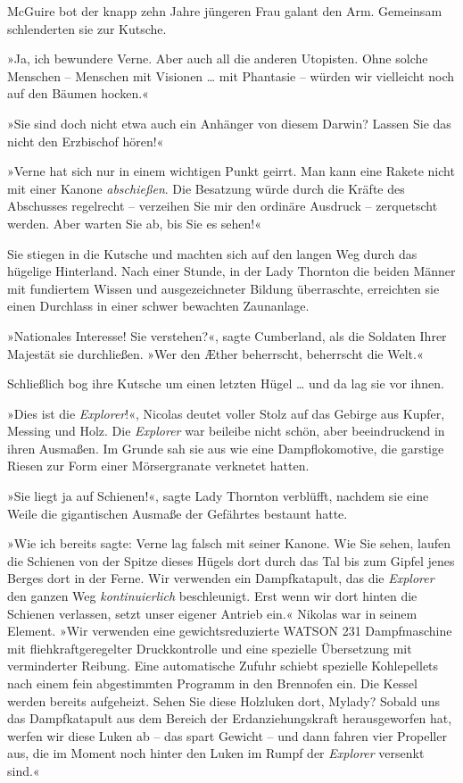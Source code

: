 McGuire bot der knapp zehn Jahre jüngeren Frau galant den Arm.
Gemeinsam schlenderten sie zur Kutsche.

»Ja, ich bewundere Verne. Aber auch all die anderen Utopisten. Ohne
solche Menschen – Menschen mit Visionen … mit Phantasie – würden
wir vielleicht noch auf den Bäumen hocken.«

»Sie sind doch nicht etwa auch ein Anhänger von diesem Darwin?
Lassen Sie das nicht den Erzbischof hören!«

»Verne hat sich nur in einem wichtigen Punkt geirrt. Man kann eine
Rakete nicht mit einer Kanone \emph{abschießen}. Die Besatzung
würde durch die Kräfte des Abschusses regelrecht – verzeihen Sie
mir den ordinäre Ausdruck – zerquetscht werden. Aber warten Sie ab,
bis Sie es sehen!«

Sie stiegen in die Kutsche und machten sich auf den langen Weg
durch das hügelige Hinterland. Nach einer Stunde, in der Lady
Thornton die beiden Männer mit fundiertem Wissen und
ausgezeichneter Bildung überraschte, erreichten sie einen Durchlass
in einer schwer bewachten Zaunanlage.

»Nationales Interesse! Sie verstehen?«, sagte Cumberland, als die
Soldaten Ihrer Majestät sie durchließen. »Wer den Æther beherrscht,
beherrscht die Welt.«

Schließlich bog ihre Kutsche um einen letzten Hügel … und da lag
sie vor ihnen.

»Dies ist die \emph{Explorer}!«, Nicolas deutet voller Stolz auf
das Gebirge aus Kupfer, Messing und Holz. Die \emph{Explorer} war
beileibe nicht schön, aber beeindruckend in ihren Ausmaßen. Im
Grunde sah sie aus wie eine Dampflokomotive, die garstige Riesen
zur Form einer Mörsergranate verknetet hatten.

»Sie liegt ja auf Schienen!«, sagte Lady Thornton verblüfft,
nachdem sie eine Weile die gigantischen Ausmaße der Gefährtes
bestaunt hatte.

»Wie ich bereits sagte: Verne lag falsch mit seiner Kanone. Wie Sie
sehen, laufen die Schienen von der Spitze dieses Hügels dort durch
das Tal bis zum Gipfel jenes Berges dort in der Ferne. Wir
verwenden ein Dampfkatapult, das die \emph{Explorer} den ganzen Weg
\emph{kontinuierlich} beschleunigt. Erst wenn wir dort hinten die
Schienen verlassen, setzt unser eigener Antrieb ein.« Nikolas war
in seinem Element. »Wir verwenden eine gewichtsreduzierte WATSON
231 Dampfmaschine mit fliehkraftgeregelter Druckkontrolle und eine
spezielle Übersetzung mit verminderter Reibung. Eine automatische
Zufuhr schiebt spezielle Kohlepellets nach einem fein abgestimmten
Programm in den Brennofen ein. Die Kessel werden bereits
aufgeheizt. Sehen Sie diese Holzluken dort, Mylady? Sobald uns das
Dampfkatapult aus dem Bereich der Erdanziehungskraft herausgeworfen
hat, werfen wir diese Luken ab – das spart Gewicht – und dann
fahren vier Propeller aus, die im Moment noch hinter den Luken im
Rumpf der \emph{Explorer} versenkt sind.«

